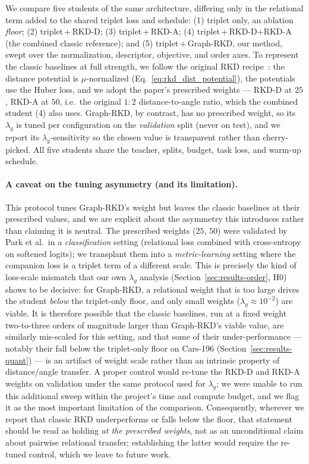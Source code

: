 \documentclass[11pt,letterpaper]{article}
\begin{document}
We compare five students of the same architecture, differing only in the relational
term added to the shared triplet loss and schedule: (1) triplet only, an ablation
\emph{floor}; (2) triplet\,+\,RKD-D; (3) triplet\,+\,RKD-A; (4) triplet\,+\,RKD-D+RKD-A
(the combined classic reference); and (5) triplet\,+\,Graph-RKD, our method, swept over
the normalization, descriptor, objective, and order axes. To represent the classic
baselines at full strength, we follow the original RKD recipe~\cite{park2019relational}:
the distance potential is $\mu$-normalized (Eq.~\ref{eq:rkd_dist_potential}), the
potentials use the Huber loss, and we adopt the paper's prescribed weights --- RKD-D at
$25$, RKD-A at $50$, i.e.\ the original $1{:}2$ distance-to-angle ratio, which the
combined student (4) also uses. Graph-RKD, by contrast, has no
prescribed weight, so its $\lambda_g$ is tuned per configuration on the
\emph{validation} split (never on test), and we report its $\lambda_g$-sensitivity so
the chosen value is transparent rather than cherry-picked. All five students share the
teacher, splits, budget, task loss, and warm-up schedule.

\paragraph{A caveat on the tuning asymmetry (and its limitation).} This protocol tunes
Graph-RKD's weight but leaves the classic baselines at their prescribed values, and we
are explicit about the asymmetry this introduces rather than claiming it is neutral. The
prescribed weights ($25$, $50$) were validated by Park et al.\ in a \emph{classification}
setting (relational loss combined with cross-entropy on softened logits); we transplant
them into a \emph{metric-learning} setting where the companion loss is a triplet term of
a different scale. This is precisely the kind of loss-scale mismatch that our own
$\lambda_g$ analysis (Section~\ref{sec:results-order}, H0) shows to be decisive: for
Graph-RKD, a relational weight that is too large drives the student \emph{below} the
triplet-only floor, and only small weights ($\lambda_g \approx 10^{-2}$) are viable. It
is therefore possible that the classic baselines, run at a fixed weight two-to-three
orders of magnitude larger than Graph-RKD's viable value, are similarly mis-scaled for
this setting, and that some of their under-performance --- notably their fall below the
triplet-only floor on Cars-196 (Section~\ref{sec:results-quant}) --- is an artifact of
weight scale rather than an intrinsic property of distance/angle transfer. A proper
control would re-tune the RKD-D and RKD-A weights on validation under the same protocol
used for $\lambda_g$; we were unable to run this additional sweep within the project's
time and compute budget, and we flag it as the most important limitation of the
comparison. Consequently, wherever we report that classic RKD underperforms or falls
below the floor, that statement should be read as holding \emph{at the prescribed
weights}, not as an unconditional claim about pairwise relational transfer; establishing
the latter would require the re-tuned control, which we leave to future work.
\end{document}
